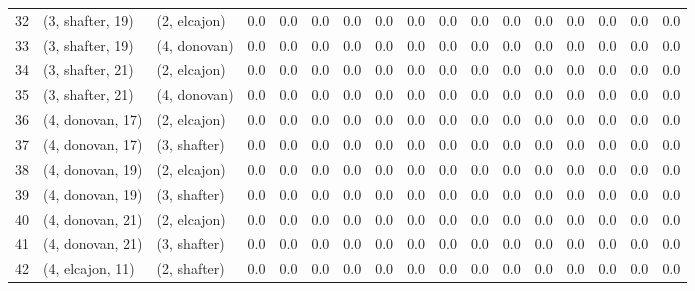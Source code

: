 \begin{tabular}{lllrrrrrrrrrrrrrr}
32 &  (3, shafter, 19) &     (2, elcajon) &      0.0 &     0.0 &        0.0 &       0.0 &      0.0 &      0.0 &      0.0 &        0.0 &       0.0 &     0.0 &     0.0 &     0.0 &       0.0 &      0.0 \\
33 &  (3, shafter, 19) &     (4, donovan) &      0.0 &     0.0 &        0.0 &       0.0 &      0.0 &      0.0 &      0.0 &        0.0 &       0.0 &     0.0 &     0.0 &     0.0 &       0.0 &      0.0 \\
34 &  (3, shafter, 21) &     (2, elcajon) &      0.0 &     0.0 &        0.0 &       0.0 &      0.0 &      0.0 &      0.0 &        0.0 &       0.0 &     0.0 &     0.0 &     0.0 &       0.0 &      0.0 \\
35 &  (3, shafter, 21) &     (4, donovan) &      0.0 &     0.0 &        0.0 &       0.0 &      0.0 &      0.0 &      0.0 &        0.0 &       0.0 &     0.0 &     0.0 &     0.0 &       0.0 &      0.0 \\
36 &  (4, donovan, 17) &     (2, elcajon) &      0.0 &     0.0 &        0.0 &       0.0 &      0.0 &      0.0 &      0.0 &        0.0 &       0.0 &     0.0 &     0.0 &     0.0 &       0.0 &      0.0 \\
37 &  (4, donovan, 17) &     (3, shafter) &      0.0 &     0.0 &        0.0 &       0.0 &      0.0 &      0.0 &      0.0 &        0.0 &       0.0 &     0.0 &     0.0 &     0.0 &       0.0 &      0.0 \\
38 &  (4, donovan, 19) &     (2, elcajon) &      0.0 &     0.0 &        0.0 &       0.0 &      0.0 &      0.0 &      0.0 &        0.0 &       0.0 &     0.0 &     0.0 &     0.0 &       0.0 &      0.0 \\
39 &  (4, donovan, 19) &     (3, shafter) &      0.0 &     0.0 &        0.0 &       0.0 &      0.0 &      0.0 &      0.0 &        0.0 &       0.0 &     0.0 &     0.0 &     0.0 &       0.0 &      0.0 \\
40 &  (4, donovan, 21) &     (2, elcajon) &      0.0 &     0.0 &        0.0 &       0.0 &      0.0 &      0.0 &      0.0 &        0.0 &       0.0 &     0.0 &     0.0 &     0.0 &       0.0 &      0.0 \\
41 &  (4, donovan, 21) &     (3, shafter) &      0.0 &     0.0 &        0.0 &       0.0 &      0.0 &      0.0 &      0.0 &        0.0 &       0.0 &     0.0 &     0.0 &     0.0 &       0.0 &      0.0 \\
42 &  (4, elcajon, 11) &     (2, shafter) &      0.0 &     0.0 &        0.0 &       0.0 &      0.0 &      0.0 &      0.0 &        0.0 &       0.0 &     0.0 &     0.0 &     0.0 &       0.0 &      0.0 \\

\end{tabular}
